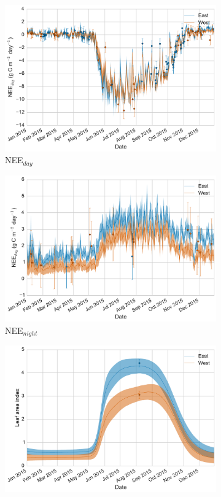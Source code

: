 \documentclass[11pt]{article}
\begin{document}
\begin{figure}[ht]
    \centering
    \begin{subfigure}[b]{0.49\textwidth}
        \includegraphics[width=\textwidth]{nee_day.pdf}
        \caption{NEE\(_{day}\)}
        \label{fig:nee_day}
    \end{subfigure}
    \begin{subfigure}[b]{0.49\textwidth}
        \includegraphics[width=\textwidth]{nee_night.pdf}
        \caption{NEE\(_{night}\)}
        \label{fig:nee_night}
    \end{subfigure}
    \begin{subfigure}[b]{0.49\textwidth}
        \includegraphics[width=\textwidth]{lai.pdf}

\end{subfigure}
\end{figure}
\end{document}
